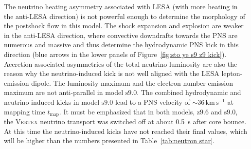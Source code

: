 \documentclass[fleqn,usenatbib]{mnras}
\newcommand{\kms}{\ensuremath{\mathrm{km\, s^{-1}}}}
\newcommand{\vertex}{\textsc{Vertex}\xspace}
\newcommand{\snine}{\ensuremath{\mathrm{s9.0}}\xspace}
\newcommand{\znine}{\ensuremath{\mathrm{z9.6}}\xspace}
\begin{document}
The neutrino heating asymmetry associated with LESA (with more heating in the anti-LESA direction) is not
powerful enough to determine the morphology of the postshock flow in this model.
The shock expansion and explosion are weaker in the anti-LESA direction, where convective 
downdrafts towards the PNS are numerous and massive and thus determine the hydrodynamic PNS kick in this
direction (blue arrows in the lower panels of Figure~\ref{fig:sto ye s9 z9 kick}). 
Accretion-associated asymmetries of the total neutrino luminosity are also 
the reason why the neutrino-induced kick is not well aligned with the LESA lepton-emission dipole.
The luminosity maximum and the electron-number emission maximum are not anti-parallel in model \snine.
The combined hydrodynamic and neutrino-induced kicks in model \snine lead to a PNS velocity of 
$\mathord{\sim}36\,\kms$ at mapping time $t_{\mathrm{map}}$.
It must be emphasized that in both models, \znine and \snine, the \vertex neutrino transport was switched 
off at about 0.5~s after core bounce. At this time the neutrino-induced kicks have not reached
their final values, which will be higher than the numbers presented in Table~\ref{tab:neutron star}.
\end{document}
